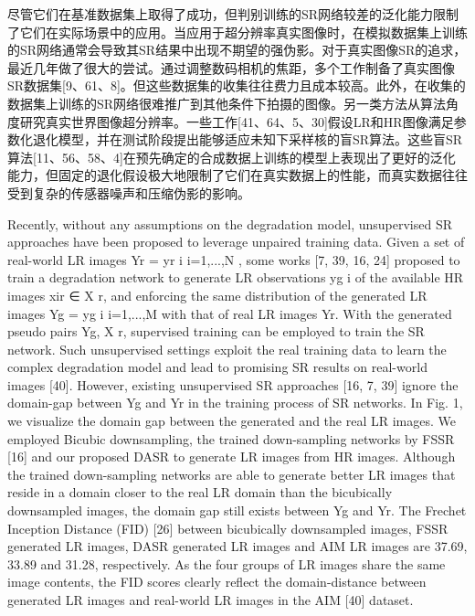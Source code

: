 尽管它们在基准数据集上取得了成功，但判别训练的SR网络较差的泛化能力限制了它们在实际场景中的应用。当应用于超分辨率真实图像时，在模拟数据集上训练的SR网络通常会导致其SR结果中出现不期望的强伪影。对于真实图像SR的追求，最近几年做了很大的尝试。通过调整数码相机的焦距，多个工作制备了真实图像SR数据集[9、61、8]。但这些数据集的收集往往费力且成本较高。此外，在收集的数据集上训练的SR网络很难推广到其他条件下拍摄的图像。另一类方法从算法角度研究真实世界图像超分辨率。一些工作[41、64、5、30]假设LR和HR图像满足参数化退化模型，并在测试阶段提出能够适应未知下采样核的盲SR算法。这些盲SR算法[11、56、58、4]在预先确定的合成数据上训练的模型上表现出了更好的泛化能力，但固定的退化假设极大地限制了它们在真实数据上的性能，而真实数据往往受到复杂的传感器噪声和压缩伪影的影响。

Recently, without any assumptions on the degradation model, unsupervised SR approaches have been proposed to leverage unpaired training data. Given a set of real-world LR images Yr = {yr i }i=1,...,N , some works [7, 39, 16, 24] proposed to train a degradation network to generate LR observations yg i of the available HR images xir ∈ X r, and enforcing the same distribution of the generated LR images Yg = {yg i }i=1,...,M with that of real LR images Yr. With the generated pseudo pairs {Yg, X r}, supervised training can be employed to train the SR network. Such unsupervised settings exploit the real training data to learn the complex degradation model and lead to promising SR results on real-world images [40]. However, existing unsupervised SR approaches [16, 7, 39] ignore the domain-gap between Yg and Yr in the training process of SR networks. In Fig. 1, we visualize the domain gap between the generated and the real LR images. We employed Bicubic downsampling, the trained down-sampling networks by FSSR [16] and our proposed DASR to generate LR images from HR images. Although the trained down-sampling networks are able to generate better LR images that reside in a domain closer to the real LR domain than the bicubically downsampled images, the domain gap still exists between Yg and Yr. The Frechet Inception Distance (FID) [26] between bicubically downsampled images, FSSR generated LR images, DASR generated LR images and AIM LR images are 37.69, 33.89 and 31.28, respectively. As the four groups of LR images share the same image contents, the FID scores clearly reflect the domain-distance between generated LR images and real-world LR images in the AIM [40] dataset.

